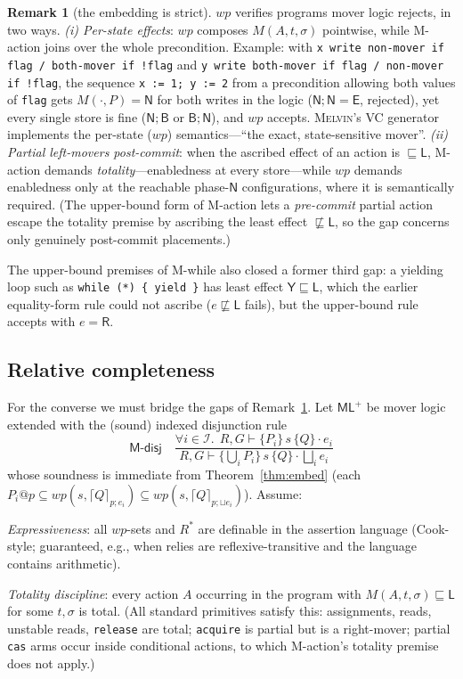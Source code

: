 \documentclass[11pt]{article}
\theoremstyle{plain}
\theoremstyle{plain}
\theoremstyle{definition}
\newtheorem{remark}{Remark}
\newcommand{\MY}{\mathsf{Y}}
\newcommand{\MB}{\mathsf{B}}
\newcommand{\MR}{\mathsf{R}}
\newcommand{\ML}{\mathsf{L}}
\newcommand{\MN}{\mathsf{N}}
\newcommand{\ME}{\mathsf{E}}
\newcommand{\sq}{\sqsubseteq}
\newcommand{\nsq}{\not\sqsubseteq}
\newcommand{\wpx}{\mathit{wp}}
\newcommand{\upemb}[2]{\lceil #1\rceil_{#2}}     %
\newcommand{\mljud}[6]{#1,#2\vdash\{#3\}\,#4\,\{#5\}\cdot #6}
\newcommand{\MLplus}{\textsf{ML}^{+}}
\newcommand{\melvin}{\textsc{Melvin}}
\newcommand{\code}[1]{\texttt{#1}}
\begin{document}
\begin{remark}[the embedding is strict]\label{rem:strict}
$\wpx$ verifies programs mover logic rejects, in two ways.
\emph{(i) Per-state effects}: $\wpx$ composes $M(A,t,\sigma)$ pointwise, while
M-action joins over the whole precondition. Example: with
\code{x write non-mover if flag / both-mover if !flag} and
\code{y write both-mover if flag / non-mover if !flag}, the sequence
\code{x := 1; y := 2} from a precondition allowing both values of \code{flag} gets
$M(\cdot,P)=\MN$ for both writes in the logic ($\MN;\MN=\ME$, rejected), yet every
single store is fine ($\MN;\MB$ or $\MB;\MN$), and $\wpx$ accepts. \melvin{}'s VC
generator implements the per-state ($\wpx$) semantics---``the exact,
state-sensitive mover''. \emph{(ii) Partial left-movers post-commit}: when the
ascribed effect of an action is $\sq\ML$, M-action demands
\emph{totality}---enabledness at every store---while $\wpx$ demands enabledness
only at the reachable phase-$\MN$ configurations, where it is semantically
required. (The upper-bound form of M-action lets a \emph{pre-commit} partial
action escape the totality premise by ascribing the least effect $\nsq\ML$, so
the gap concerns only genuinely post-commit placements.)

The upper-bound premises of M-while also closed a former third gap: a yielding
loop such as \code{while (*) \{ yield \}} has least effect $\MY\sq\ML$, which
the earlier equality-form rule could not ascribe ($e\nsq\ML$ fails), but the
upper-bound rule accepts with $e=\MR$.
\end{remark}

\subsection{Relative completeness}

For the converse we must bridge the gaps of Remark~\ref{rem:strict}. Let
$\MLplus$ be mover logic extended with the (sound) indexed disjunction rule
\[
\textsf{M-disj}\quad
\frac{\forall i\in\mathcal{I}.\ \ \mljud{R}{G}{P_i}{s}{Q}{e_i}}
     {\mljud{R}{G}{\bigcup_i P_i}{s}{Q}{\bigsqcup_i e_i}}
\]
whose soundness is immediate from Theorem~\ref{thm:embed} (each
$P_i@p\subseteq \wpx(s,\upemb{Q}{p;e_i})\subseteq\wpx(s,\upemb{Q}{p;\sqcup e_i})$).
Assume:
\begin{description}[leftmargin=3.2em,style=nextline,itemsep=2pt]
\item[(E)] \emph{Expressiveness}: all $\wpx$-sets and $R^*$ are definable in the
  assertion language (Cook-style; guaranteed, e.g., when relies are
  reflexive-transitive and the language contains arithmetic).
\item[(T)] \emph{Totality discipline}: every action $A$ occurring in the program
  with $M(A,t,\sigma)\sq\ML$ for some $t,\sigma$ is total. (All standard primitives
  satisfy this: assignments, reads, unstable reads, \code{release} are total;
  \code{acquire} is partial but is a right-mover; partial \code{cas} arms occur
  inside conditional actions, to which M-action's totality premise does not apply.)
\end{description}
\end{document}
